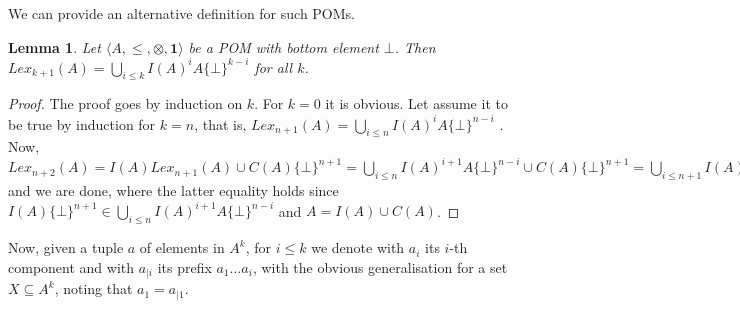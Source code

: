\documentclass[a4paper]{elsarticle}
\newtheorem{lemma}{Lemma}
\newcommand{\monop}{\otimes}
\newcommand{\1}{\mathbf{1}}
\begin{document}
We can provide an alternative definition for such POMs.

\begin{lemma}
	Let $\langle A, \leq, \monop, \1 \rangle$ be a POM with bottom element $\bot$.
	Then $Lex_{k+1}(A) = \bigcup_{i \leq k}I(A)^i A \{\bot\}^{k-i}$ for all $k$.
\end{lemma}
\begin{proof}
	The proof goes by induction on $k$. For $k = 0$ it is obvious.
	Let assume it to be true by induction for $k = n$, that is,
	$Lex_{n+1}(A) = \bigcup_{i \leq n}I(A)^i A \{\bot\}^{n-i}$ .
	Now, 
	$Lex_{n+2}(A) =  I(A) Lex_{n+1}(A) \cup C(A) \{\bot\}^{n+1} =
	\bigcup_{i \leq n}I(A)^{i+1} A \{\bot\}^{n-i} \cup C(A) \{\bot\}^{n+1} =
	\bigcup_{i \leq n+1}I(A)^{i} A \{\bot\}^{n+1-i}$
	and we are done, where the latter equality holds since
	$I(A)\{\bot\}^{n+1} \in \bigcup_{i \leq n}I(A)^{i+1} A \{\bot\}^{n-i}$
	and $A = I(A) \cup C(A)$.
\end{proof}

Now, given a tuple $a$ of elements in $A^k$, for $i \leq k$ we denote with $a_i$ its 
$i$-th component and with $a_{\mid i}$ its prefix $a_1 \ldots a_i$, with the obvious 
generalisation for a set $X \subseteq A^k$, noting that $a_1 = a_{\mid 1}$.
\end{document}
